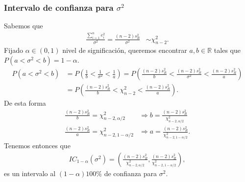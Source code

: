 \subsubsection{Intervalo de confianza para $\sigma^2$}
Sabemos que
\begin{align*}
    \frac{\sum_{i=1}^{n} e_i^2}{\sigma^2} = \frac{(n-2)s_R^2}{\sigma^2} & \sim \chi_{n-2}^2.
\end{align*}
Fijado $\alpha \in (0,1)$ nivel de significación, queremos encontrar $a,b \in \mathbb{R}$ tales que $P(a < \sigma^2 < b) = 1 - \alpha$.
\begin{align*}
    P(a < \sigma^2 < b) & = P\left( \frac{1}{b} < \frac{1}{\sigma^2} < \frac{1}{a} \right) = P\left( \frac{(n-2)s_R^2}{b} < \frac{(n-2)s_R^2}{\sigma^2} < \frac{(n-2)s_R^2}{a} \right) \\
                        & = P\left( \frac{(n-2)s_R^2}{b} < \chi_{n-2}^2 < \frac{(n-2)s_R^2}{a} \right).
\end{align*}
De esta forma
\begin{align*}
    \frac{(n-2)s_R^2}{b} = \chi_{n-2,\alpha/2}^2   & \Longrightarrow b = \frac{(n-2)s_R^2}{\chi_{n-2,\alpha/2}^2}   \\
    \frac{(n-2)s_R^2}{a} = \chi_{n-2,1-\alpha/2}^2 & \Longrightarrow a= \frac{(n-2)s_R^2}{\chi_{n-2,1-\alpha/2}^2}.
\end{align*}
Tenemos entonces que
\begin{align*}
    IC_{1-\alpha}(\sigma^2) = \left(\frac{(n-2)s_R^2}{\chi_{n-2,\alpha/2}^2}, \frac{(n-2)s_R^2}{\chi_{n-2,1-\alpha/2}^2} \right),
\end{align*}
es un intervalo al $(1-\alpha)100 \%$ de confianza para $\sigma^2$.

